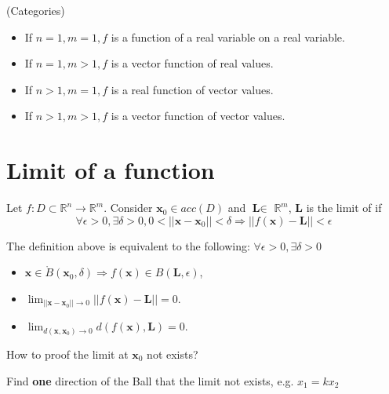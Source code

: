 \begin{remark*} (Categories)
    \begin{itemize}
        \item
              If \(n = 1, m = 1, f\) is a function of a real variable on a real
              variable.
        \item
              If \(n = 1, m > 1, f\) is a vector function of real values.
        \item
              If \(n > 1, m = 1, f\) is a real function of vector values.
        \item
              If \(n > 1, m > 1, f\) is a vector function of vector values.
    \end{itemize}
\end{remark*}

\section{Limit of a function}

\begin{definition}[Limits]
    Let $f: D \subset \mathbb{R}^{n} \to \mathbb{R}^{m}$. Consider
    \(\mathbf{x}_{0}\in a c c(D)\) and \(\textbf{L}\in\) \(\mathbb{R}^{m}\), $\mathbf{L}$ is the limit of if \begin{equation*}
        \forall \epsilon > 0, \exists \delta > 0, 0<||\mathbf{x} - \mathbf{x}_{0}|| < \delta \Rightarrow \left|\left|f(\mathbf{x}) - \mathbf{L}\right|\right|< \epsilon
    \end{equation*}
\end{definition}

\begin{remark*}
    The definition above is equivalent to the following:
    $\forall \epsilon > 0, \exists \delta > 0$
    \begin{itemize}
        \item $\mathbf{x} \in \mathring{B}(\mathbf{x}_0, \delta) \Rightarrow f(\mathbf{x}) \in B(\mathbf{L}, \epsilon)$,
        \item $\lim_{||\mathbf{x} - \mathbf{x}_0||\rightarrow 0}||f(\mathbf{x}) - \mathbf{L}|| = 0$.
        \item $\lim_{d(\mathbf{x},\mathbf{x}_0)\rightarrow 0}d(f(\mathbf{x}),\mathbf{L}) = 0$.
    \end{itemize}
\end{remark*}

\begin{remark*}
    How to proof the limit at \(\mathbf{x}_0\) not exists?

    Find \textbf{one} direction of the Ball that the limit not exists, e.g. \(x_1=kx_2\)
\end{remark*}

